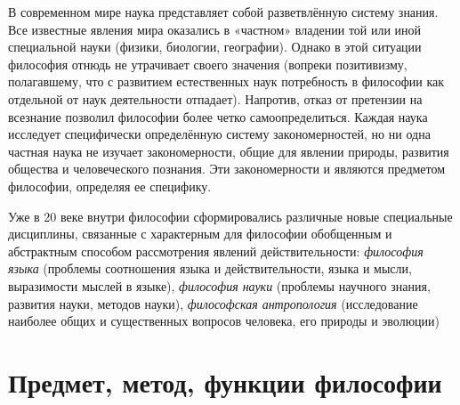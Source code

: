 \documentclass[a4paper, 12pt]{article}
\theoremstyle{plain} %
\theoremstyle{definition} %
\theoremstyle{remark} %
\begin{document}
\vspace{1em}
В современном мире наука представляет собой разветвлённую систему знания. Все известные явления мира оказались в «частном» владении той или иной специальной науки (физики, биологии, географии). Однако в этой ситуации философия отнюдь не утрачивает своего значения (вопреки позитивизму, полагавшему, что с развитием естественных наук потребность в философии как отдельной от наук деятельности отпадает). Напротив, отказ от претензии на всезнание позволил философии более четко самоопределиться. Каждая наука исследует специфически определённую систему закономерностей, но ни одна частная наука не изучает закономерности, общие для явлении природы, развития общества и человеческого познания. Эти закономерности и являются предметом философии, определяя ее специфику.

\vspace{1em}
Уже в 20 веке внутри философии сформировались различные новые специальные дисциплины, связанные с характерным для философии обобщенным и абстрактным способом рассмотрения явлений действительности: \emph{философия языка} (проблемы соотношения языка и действительности, языка и мысли, выразимости мыслей в языке), \emph{философия науки} (проблемы научного знания, развития науки, методов науки), \emph{философская антропология} (исследование наиболее общих и существенных вопросов человека, его природы и эволюции)

\section{Предмет, метод, функции философии}
\end{document}
